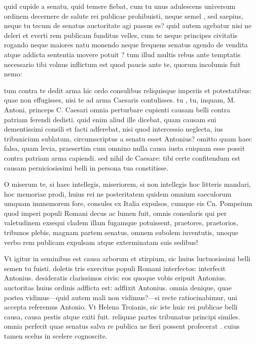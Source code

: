  quid cupide a senatu, quid temere fiebat, cum tu unus adulescens universum ordinem decernere de salute rei publicae prohibuisti, neque semel , sed saepius, neque tu tecum de senatus auctoritate agi passus es? quid autem agebatur nisi ne deleri et everti rem publicam funditus velles, cum te neque principes civitatis rogando neque maiores natu monendo neque frequens senatus agendo de vendita atque addicta sententia movere potuit ? tum illud multis rebus ante temptatis necessario tibi volnus inflictum est quod paucis ante te, quorum incolumis fuit nemo:

 tum contra te dedit arma hic ordo consulibus reliquisque imperiis et potestatibus: quae non effugisses, nisi te ad arma Caesaris contulisses. tu , tu, inquam, M. Antoni, princeps C. Caesari omnia perturbare cupienti causam belli contra patriam ferendi dedisti. quid enim aliud ille dicebat, quam causam sui dementissimi consili et facti adferebat, nisi quod intercessio neglecta, ius tribunicium sublatum, circumscriptus a senatu esset Antonius? omitto quam haec falsa, quam levia, praesertim cum omnino nulla causa iusta cuiquam esse possit contra patriam arma capiendi. sed nihil de Caesare: tibi certe confitendum est causam perniciosissimi belli in persona tua constitisse.

 O miserum te, si haec intellegis, miseriorem, si non intellegis hoc litteris mandari, hoc memoriae prodi, huius rei ne posteritatem quidem omnium saeculorum umquam immemorem fore, consules ex Italia expulsos, cumque eis Cn. Pompeium quod imperi populi Romani decus ac lumen fuit, omnis consularis qui per valetudinem exsequi cladem illam fugamque potuissent, praetores, praetorios, tribunos plebis, magnam partem senatus, omnem subolem iuventutis, unoque verbo rem publicam expulsam atque exterminatam suis sedibus!

 Vt igitur in seminibus est causa arborum et stirpium, sic huius luctuosissimi belli semen tu fuisti. doletis tris exercitus populi Romani interfectos: interfecit Antonius. desideratis clarissimos civis: eos quoque vobis eripuit Antonius. auctoritas huius ordinis adflicta est: adflixit Antonius. omnia denique, quae postea vidimus—quid autem mali non vidimus?—si recte ratiocinabimur, uni accepta referemus Antonio. Vt Helena Troianis, sic iste huic rei publicae belli causa, causa pestis atque exiti fuit. reliquae partes tribunatus principi similes. omnia perfecit quae senatus salva re publica ne fieri possent profecerat . cuius tamen scelus in scelere cognoscite.


